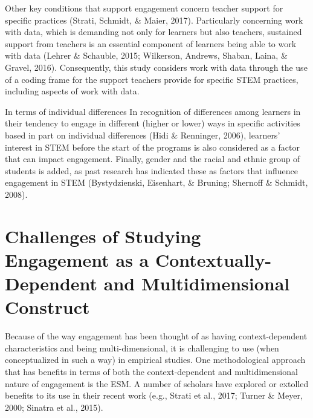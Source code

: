 \documentclass[]{msu-thesis}
\theoremstyle{definition}
\theoremstyle{definition}
\theoremstyle{definition}
\theoremstyle{remark}
\begin{document}
Other key conditions that support engagement concern teacher support for
specific practices (Strati, Schmidt, \& Maier, 2017). Particularly
concerning work with data, which is demanding not only for learners but
also teachers, sustained support from teachers is an essential component
of learners being able to work with data (Lehrer \& Schauble, 2015;
Wilkerson, Andrews, Shaban, Laina, \& Gravel, 2016). Consequently, this
study considers work with data through the use of a coding frame for the
support teachers provide for specific STEM practices, including aspects
of work with data.

In terms of individual differences In recognition of differences among
learners in their tendency to engage in different (higher or lower) ways
in specific activities based in part on individual differences (Hidi \&
Renninger, 2006), learners' interest in STEM before the start of the
programs is also considered as a factor that can impact engagement.
Finally, gender and the racial and ethnic group of students is added, as
past research has indicated these as factors that influence engagement
in STEM (Bystydzienski, Eisenhart, \& Bruning; Shernoff \& Schmidt,
2008).

\section{Challenges of Studying Engagement as a Contextually-Dependent
and Multidimensional
Construct}\label{challenges-of-studying-engagement-as-a-contextually-dependent-and-multidimensional-construct}

Because of the way engagement has been thought of as having
context-dependent characteristics and being multi-dimensional, it is
challenging to use (when conceptualized in such a way) in empirical
studies. One methodological approach that has benefits in terms of both
the context-dependent and multidimensional nature of engagement is the
ESM. A number of scholars have explored or extolled benefits to its use
in their recent work (e.g., Strati et al., 2017; Turner \& Meyer, 2000;
Sinatra et al., 2015).
\end{document}
